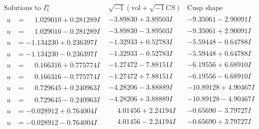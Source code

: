 \documentclass[1p]{elsarticle_modified}
\theoremstyle{definition}
\newcommand{\I}{\sqrt{-1}}
\begin{document}
$$\begin{array}{c|c|c}  
\text{Solutions to }I^u_{1}& \I (\text{vol} + \sqrt{-1}CS) & \text{Cusp shape}\\
 \hline 
\begin{aligned}
u &= \phantom{-}1.029010 + 0.281289 I\end{aligned}
 & -3.89830 + 3.89503 I & -9.35061 - 2.90091 I \\ \hline\begin{aligned}
u &= \phantom{-}1.029010 - 0.281289 I\end{aligned}
 & -3.89830 - 3.89503 I & -9.35061 + 2.90091 I \\ \hline\begin{aligned}
u &= -1.134230 + 0.236397 I\end{aligned}
 & -1.32933 + 0.52783 I & -5.59448 - 0.64788 I \\ \hline\begin{aligned}
u &= -1.134230 - 0.236397 I\end{aligned}
 & -1.32933 - 0.52783 I & -5.59448 + 0.64788 I \\ \hline\begin{aligned}
u &= \phantom{-}0.166316 + 0.775774 I\end{aligned}
 & -1.27472 - 7.88151 I & -6.19556 + 6.68910 I \\ \hline\begin{aligned}
u &= \phantom{-}0.166316 - 0.775774 I\end{aligned}
 & -1.27472 + 7.88151 I & -6.19556 - 6.68910 I \\ \hline\begin{aligned}
u &= \phantom{-}0.729645 + 0.240963 I\end{aligned}
 & -4.28206 - 3.88889 I & -10.89128 + 4.90467 I \\ \hline\begin{aligned}
u &= \phantom{-}0.729645 - 0.240963 I\end{aligned}
 & -4.28206 + 3.88889 I & -10.89128 - 4.90467 I \\ \hline\begin{aligned}
u &= -0.028912 + 0.764004 I\end{aligned}
 & \phantom{-}4.01456 + 2.24194 I & -0.65690 - 3.79727 I \\ \hline\begin{aligned}
u &= -0.028912 - 0.764004 I\end{aligned}
 & \phantom{-}4.01456 - 2.24194 I & -0.65690 + 3.79727 I \\ \hline\begin{aligned}

\end{aligned}
\end{array}$$
\end{document}
